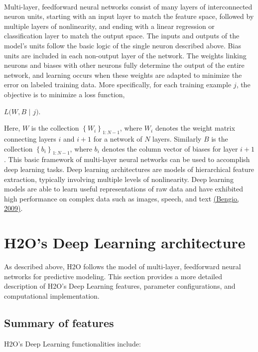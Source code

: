 \\
\noindent
Multi-layer, feedforward neural networks consist of many layers of interconnected neuron units, starting with an input layer to match the feature space, followed by multiple layers of nonlinearity, and ending with a linear regression or classification layer to match the output space. The inputs and outputs of the model's units follow the basic logic of the single neuron described above. Bias units are included in each non-output layer of the network. The weights linking neurons and biases with other neurons fully determine the output of the entire network, and learning occurs when these weights are adapted to minimize the error on labeled training data. More specifically, for each training example $j$, the objective is to minimize a loss function, 
\begin{center}
$L(W,B$ $|$ $j)$.
\end{center}
Here, $W$ is the collection $\left\{W_i\right\}_{1:N-1}$, where $W_i$ denotes the weight matrix connecting layers $i$ and $i+1$ for a network of $N$ layers. Similarly $B$ is the collection $\left\{b_i\right\}_{1:N-1}$, where $b_i$ denotes the column vector of biases for layer $i+1$.
This basic framework of multi-layer neural networks can be used to accomplish deep learning tasks. Deep learning architectures are models of hierarchical feature extraction, typically involving multiple levels of nonlinearity. Deep learning models are able to learn useful representations of raw data and have exhibited high performance on complex data such as images, speech, and text \href{http://www.iro.umontreal.ca/~lisa/pointeurs/TR1312.pdf}{(Bengio, 2009)}. 


\section{H2O's Deep Learning architecture} 

As described above, H2O follows the model of multi-layer, feedforward neural networks for predictive modeling. This section provides a more detailed description of H2O's Deep Learning features, parameter configurations, and computational implementation.

\subsection{Summary of features} 
H2O's Deep Learning functionalities include:

